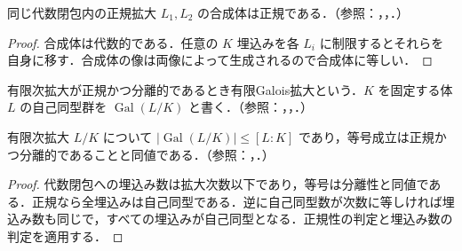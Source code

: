 \begin{prop}[合成体の正規性]
同じ代数閉包内の正規拡大 $L_1,L_2$ の合成体は正規である．（参照：，，．）
\end{prop}
\begin{proof}
合成体は代数的である．任意の $K$ 埋込みを各 $L_i$ に制限するとそれらを自身に移す．合成体の像は両像によって生成されるので合成体に等しい．
\end{proof}
\begin{defn}[有限Galois拡大]
有限次拡大が正規かつ分離的であるとき有限Galois拡大という．$K$ を固定する体 $L$ の自己同型群を $\operatorname{Gal}(L/K)$ と書く．（参照：，，．）
\end{defn}
\begin{prop}[有限Galois拡大の自己同型数]
有限次拡大 $L/K$ について $|\operatorname{Gal}(L/K)|\leq[L:K]$ であり，等号成立は正規かつ分離的であることと同値である．（参照：，．）
\end{prop}
\begin{proof}
代数閉包への埋込み数は拡大次数以下であり，等号は分離性と同値である．正規なら全埋込みは自己同型である．逆に自己同型数が次数に等しければ埋込み数も同じで，すべての埋込みが自己同型となる．正規性の判定と埋込み数の判定を適用する．
\end{proof}
